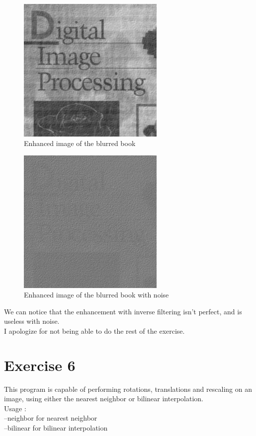 \documentclass[10pt]{article}
\begin{document}
\begin{figure}[!ht]
	\centering
	\includegraphics[height=200pt]{./ex5/filteredBook.jpg}
	\caption{Enhanced image of the blurred book}
\end{figure}
\begin{figure}[!ht]
	\centering
	\includegraphics[height=200pt]{./ex5/filteredGaussBook.jpg}
	\caption{Enhanced image of the blurred book with noise}
\end{figure}
\clearpage

We can notice that the enhancement with inverse filtering isn't perfect, and is useless with noise.\\

I apologize for not being able to do the rest of the exercise.

\section{Exercise 6}
This program is capable of performing rotations, translations and rescaling on an image, using either the nearest neighbor or bilinear interpolation.\\

Usage :\\
--neighbor for nearest neighbor\\
--bilinear for bilinear interpolation\\
\end{document}
